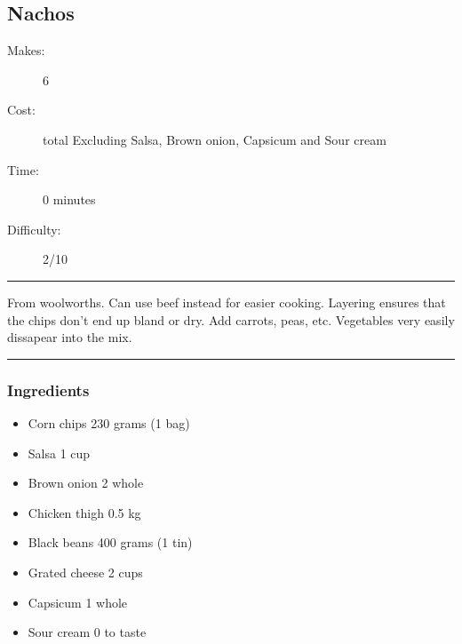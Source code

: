 \documentclass[]{article}
\begin{document}
\subsection*{\center\huge Nachos}
\begin{description}
\item[Makes:] 6 
\item[Cost:]  total Excluding Salsa, Brown onion, Capsicum and Sour cream
\item[Time:] 0 minutes
\item[Difficulty:] 2/10
\end{description}
\vspace{0.2cm}\hrule\vspace{0.5cm}
\begin{adjustwidth}{0.5 cm}{0.5 cm}

From woolworths. Can use beef instead for easier cooking. Layering ensures that the chips don't end up bland or dry. Add carrots, peas, etc. Vegetables very easily dissapear into the mix. \hfill{}\color{black}

\end{adjustwidth}
\vspace{0.5cm}\hrule
\subsubsection*{\Large Ingredients}
\begin{multicols}{2}
\begin{itemize}
 \item Corn chips \hfill 230 grams (1 bag)
 \item Salsa \hfill 1 cup
 \item Brown onion \hfill 2 whole
 \item Chicken thigh \hfill 0.5 kg
 \item Black beans \hfill 400 grams (1 tin)
 \item Grated cheese \hfill 2 cups
 \item Capsicum \hfill 1 whole
 \item Sour cream \hfill 0 to taste
\end{itemize}
\end{multicols}
\end{document}
